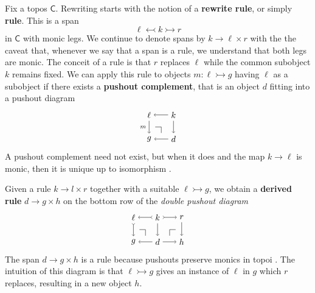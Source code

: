 \documentclass{amsart}
\newcommand{\C}{\cat{C}}
\newcommand{\defn}[1]{\textbf{#1}}
\newcommand{\cat}[1]{\mathsf{#1}}
\newcommand{\from}{\colon}
\newcommand{\monicto}{\rightarrowtail}
\newcommand{\monicgets}{\leftarrowtail}
\newcommand{\spn}[3]{#2 \to #1 \times #3}
\theoremstyle{remark}
\theoremstyle{definition}
\begin{document}
Fix a topos $ \C $.  Rewriting starts with the notion of a
\defn{rewrite rule}, or simply \defn{rule}.  This is a span
%
\[
  \ell \monicgets k \monicto r
\]
% 
in $ \C $ with monic legs. We continue to denote spans by
$ \spn{\ell}{k}{r} $ with the the caveat that, whenever we say that a
span is a rule, we understand that both legs are
monic. The conceit of a rule is that $ r $ replaces $ \ell $ while the common subobject $ k $ remains fixed. We can
apply this rule to objects $ m \from \ell \monicto g $
having $ \ell $ as a subobject if there exists a
\defn{pushout complement}, that is an object $ d $ fitting
into a pushout diagram
% 
\[
  \begin{tikzpicture}
    \node (l) at (0,1) {$ \ell $};
    \node (k) at (1,1) {$ k $};
    \node (g) at (0,0) {$ g $};
    \node (d) at (1,0) {$ d $};
    \draw [->] (k) to node [] {\scriptsize{$  $}} (l);
    \draw [->] (d) to node [] {\scriptsize{$  $}} (g);
    \draw [->] (l) to node [left] {\scriptsize{$ m $}} (g);
    \draw [->] (k) to node [] {\scriptsize{$  $}} (d);
    \begin{scope}[shift={(0,0)}]
      \draw [-] (0.25,0.5) to node [] {} (0.5,0.5);
      \draw [-] (0.5,0.5) to node [] {} (0.5,0.25);
    \end{scope}
  \end{tikzpicture}
\]
% 
A pushout complement need not exist, but when it does and
the map $ k \to \ell $ is monic, then it is unique up to
isomorphism \cite[Lem.~15]{LackSobo_Adhesive}.

Given a rule $ \spn{l}{k}{r} $ together with a suitable
$ \ell \monicto g $, we obtain a \defn{derived rule}
$ \spn{g}{d}{h} $ on the bottom row of the \emph{double
  pushout diagram}
%
\[
  \begin{tikzpicture}
    \node (1) at (0,1) {$ \ell $};
    \node (2) at (1,1) {$ k $};
    \node (3) at (2,1) {$ r $};
    \node (4) at (0,0) {$ g $};
    \node (5) at (1,0) {$ d $};
    \node (6) at (2,0) {$ h $};
    \draw [>->] (2) to node [] {\scriptsize{$  $}} (1);
    \draw [>->] (2) to node [] {\scriptsize{$  $}} (3);
    \draw [->] (5) to node [] {\scriptsize{$  $}} (4);
    \draw [->] (5) to node [] {\scriptsize{$  $}} (6);
    \draw [>->] (1) to node [] {\scriptsize{$  $}} (4);
    \draw [->] (2) to node [] {\scriptsize{$  $}} (5);
    \draw [->] (3) to node [] {\scriptsize{$  $}} (6);
     \begin{scope}[shift={(0,0)}]
      \draw [-] (0.25,0.5) to node [] {} (0.5,0.5);
      \draw [-] (0.5,0.5) to node [] {} (0.5,0.25);
    \end{scope}
     \begin{scope}[shift={(1.5,0)}]
      \draw [-] (0,0.25) to (0,0.5);
      \draw [-] (0,0.5) to node [] {} (0.25,0.5);
    \end{scope}
  \end{tikzpicture}
\]
%
The span $ \spn{g}{d}{h} $ is a rule because pushouts
preserve monics in topoi
\cite[Lem.~12]{LackSobo_Adhesive}. The intuition of this
diagram is that $ \ell \monicto g $ gives an instance of
$ \ell $ in $ g $ which $ r $ replaces, resulting in a new object $ h $.
\end{document}
